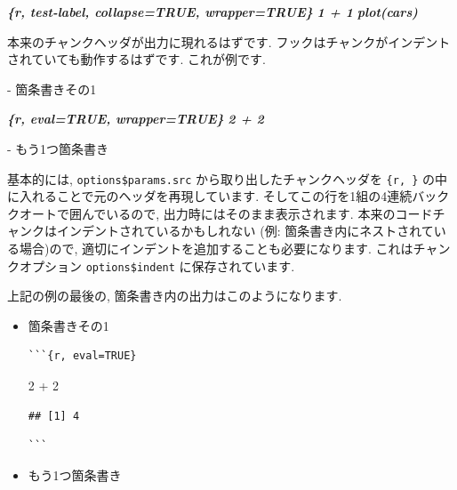 \documentclass[
  11pt,
  lualatex,
  ja=standard]{bxjsreport}
\newenvironment{Shaded}{\begin{snugshade}}{\end{snugshade}}
\newcommand{\DecValTok}[1]{\textcolor[rgb]{0.00,0.00,0.81}{#1}}
\newcommand{\InformationTok}[1]{\textcolor[rgb]{0.56,0.35,0.01}{\textbf{\textit{#1}}}}
\newcommand{\NormalTok}[1]{#1}
\newcommand{\SpecialCharTok}[1]{\textcolor[rgb]{0.00,0.00,0.00}{#1}}
\newcommand{\SpecialStringTok}[1]{\textcolor[rgb]{0.31,0.60,0.02}{#1}}
\renewenvironment{quote}{\def\FrameCommand{{\color{quotebarcolor}{\vrule width 3pt}}\hspace{10pt}}\MakeFramed{\advance\hsize-\width\FrameRestore}}{\endMakeFramed}
\begin{document}
\begin{Shaded}
\begin{Highlighting}[]
\InformationTok{\textasciigrave{}\textasciigrave{}\textasciigrave{}\{r, test{-}label, collapse=TRUE, wrapper=TRUE\}}
\InformationTok{1 + 1}
\InformationTok{plot(cars)}
\InformationTok{\textasciigrave{}\textasciigrave{}\textasciigrave{}}

\NormalTok{本来のチャンクヘッダが出力に現れるはずです. フックはチャンクがインデントされていても動作するはずです. これが例です.}

\SpecialStringTok{{-} }\NormalTok{箇条書きその1}

  \InformationTok{\textasciigrave{}\textasciigrave{}\textasciigrave{}\{r, eval=TRUE, wrapper=TRUE\}}
\InformationTok{  2 + 2}
\InformationTok{  \textasciigrave{}\textasciigrave{}\textasciigrave{}}

\SpecialStringTok{{-} }\NormalTok{もう1つ箇条書き}
\end{Highlighting}
\end{Shaded}

基本的には, \texttt{options\$params.src} から取り出したチャンクヘッダを \texttt{\textasciigrave{}\textasciigrave{}\textasciigrave{}\{r,\ \}} の中に入れることで元のヘッダを再現しています. そしてこの行を1組の4連続バッククオートで囲んでいるので, 出力時にはそのまま表示されます. 本来のコードチャンクはインデントされているかもしれない (例: 箇条書き内にネストされている場合)ので, 適切にインデントを追加することも必要になります. これはチャンクオプション \texttt{options\$indent} に保存されています.

上記の例の最後の, 箇条書き内の出力はこのようになります.

\begin{quote}
\begin{itemize}
\item
  箇条書きその1

\begin{verbatim}
```{r, eval=TRUE}
\end{verbatim}

\begin{Shaded}
\begin{Highlighting}[]
\DecValTok{2} \SpecialCharTok{+} \DecValTok{2}
\end{Highlighting}
\end{Shaded}

\begin{verbatim}
## [1] 4
\end{verbatim}

\begin{verbatim}
```
\end{verbatim}
\item
  もう1つ箇条書き
\end{itemize}
\end{quote}
\end{document}
